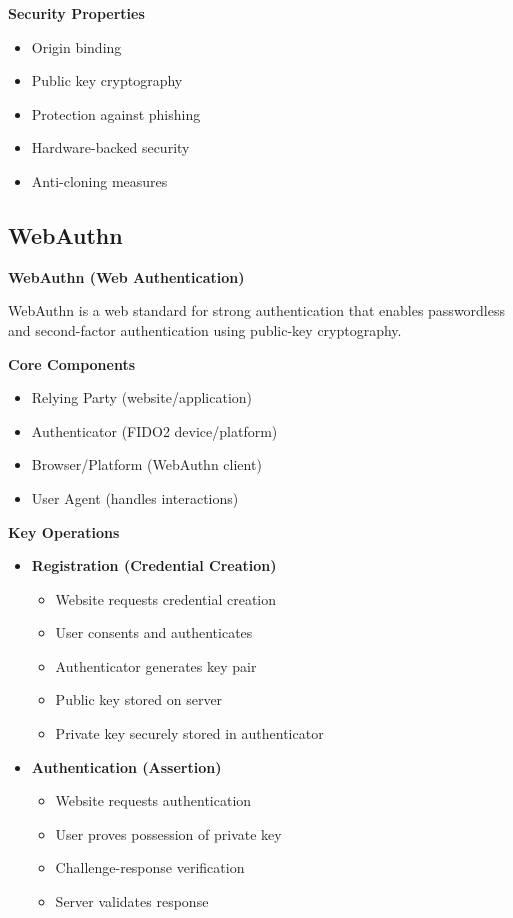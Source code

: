 \textbf{Security Properties}
\begin{itemize}
    \item Origin binding
    \item Public key cryptography
    \item Protection against phishing
    \item Hardware-backed security
    \item Anti-cloning measures
\end{itemize}

\subsection{WebAuthn}
\textbf{WebAuthn (Web Authentication)}

WebAuthn is a web standard for strong authentication that enables passwordless and second-factor authentication using public-key cryptography.

\textbf{Core Components}
\begin{itemize}
    \item Relying Party (website/application)
    \item Authenticator (FIDO2 device/platform)
    \item Browser/Platform (WebAuthn client)
    \item User Agent (handles interactions)
\end{itemize}

\textbf{Key Operations}
\begin{itemize}
    \item \textbf{Registration (Credential Creation)}
        \begin{itemize}
            \item Website requests credential creation
            \item User consents and authenticates
            \item Authenticator generates key pair
            \item Public key stored on server
            \item Private key securely stored in authenticator
        \end{itemize}
    
    \item \textbf{Authentication (Assertion)}
        \begin{itemize}
            \item Website requests authentication
            \item User proves possession of private key
            \item Challenge-response verification
            \item Server validates response
        \end{itemize}
\end{itemize}

